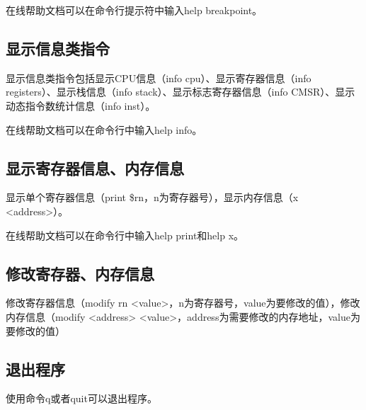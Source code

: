 \documentclass[12pt,a4paper]{article}
\begin{document}
在线帮助文档可以在命令行提示符中输入help breakpoint。

\subsection{显示信息类指令}
显示信息类指令包括显示CPU信息（info cpu）、显示寄存器信息（info registers）、显示栈信息（info stack）、显示标志寄存器信息（info CMSR）、显示动态指令数统计信息（info inst）。

在线帮助文档可以在命令行中输入help info。

\subsection{显示寄存器信息、内存信息}
显示单个寄存器信息（print \$rn，n为寄存器号），显示内存信息（x <address>）。

在线帮助文档可以在命令行中输入help print和help x。

\subsection{修改寄存器、内存信息}
修改寄存器信息（modify rn <value>，n为寄存器号，value为要修改的值），修改内存信息（modify <address> <value>，address为需要修改的内存地址，value为要修改的值）

\subsection{退出程序}
使用命令q或者quit可以退出程序。
\end{document}

